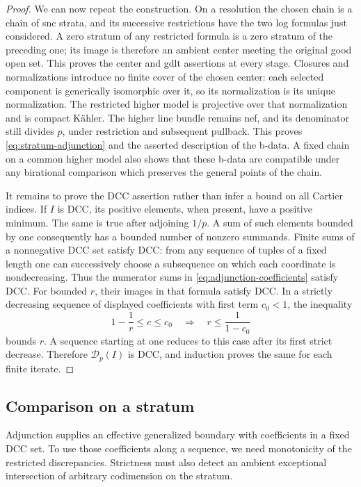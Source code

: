 \begin{proof}
We can now repeat the construction.  On a resolution the chosen
chain is a chain of snc strata, and its successive restrictions
have the two log formulas just considered.  A zero stratum of
any restricted formula is a zero stratum of the preceding one;
its image is therefore an ambient center meeting the original
good open set.  This proves the center and gdlt assertions at
every stage.  Closures and normalizations introduce no finite
cover of the chosen center: each selected component is
generically isomorphic over it, so its normalization is its
unique normalization.  The restricted higher model is
projective over that normalization and is compact K\"ahler.
The higher line bundle remains nef, and its denominator still
divides $p$, under restriction and subsequent pullback.
This proves \eqref{eq:stratum-adjunction} and the asserted
description of the b-data.  A fixed chain on a common higher
model also shows that these b-data are compatible under any
birational comparison which preserves the general points of
the chain.

It remains to prove the DCC assertion rather than infer a
bound on all Cartier indices.  If $I$ is DCC, its positive
elements, when present, have a positive minimum.  The same is
true after adjoining $1/p$.  A sum of such elements bounded
by one consequently has a bounded number of nonzero summands.
Finite sums of a nonnegative DCC set satisfy DCC: from any
sequence of tuples of a fixed length one can successively
choose a subsequence on which each coordinate is
nondecreasing.  Thus the numerator sums in
\eqref{eq:adjunction-coefficients} satisfy DCC.  For bounded
$r$, their images in that formula satisfy DCC.  In a strictly
decreasing sequence of displayed coefficients with first
term $c_0<1$, the inequality
\[
  1-\frac1r\leq c\leq c_0
  \quad\Longrightarrow\quad r\leq\frac1{1-c_0}
\]
bounds $r$.  A sequence starting at one reduces to this case
after its first strict decrease.  Therefore
$\mathcal D_p(I)$ is DCC, and induction proves the same for
each finite iterate.
\end{proof}

\subsection{Comparison on a stratum}

Adjunction supplies an effective generalized boundary with coefficients
in a fixed DCC set.  To use those coefficients along a sequence, we need
monotonicity of the restricted discrepancies.  Strictness must also
detect an ambient exceptional intersection of arbitrary codimension
on the stratum.

